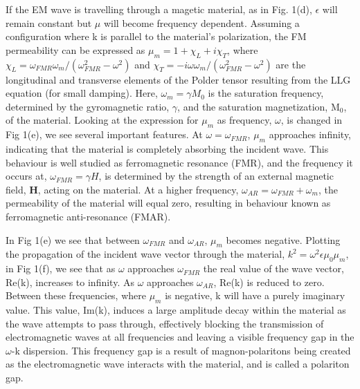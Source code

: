 \documentclass[prb,twocolumn,showpacs,preprintnumbers,amsmath,amssymb]{revtex4-1}
\begin{document}
If the EM wave is travelling through a magetic material, as in Fig. 1(d), $\epsilon$ will remain constant but $\mu$ will become frequency dependent. Assuming a configuration where k is parallel to the material's polarization, the FM permeability can be expressed as $\mu_{m}=1+\chi_{L}+i\chi_{T}$, where $\chi_{L}=\omega_{FMR}\omega_{m}/(\omega_{FMR}^{2}-\omega^{2})$ and $\chi_{T}=-i\omega\omega_{m}/(\omega_{FMR}^{2}-\omega^{2})$ are the longitudinal and transverse elements of the Polder tensor resulting from the LLG equation (for small damping)\cite{MM}. Here, $\omega_{m}=\gamma M_{0}$ is the saturation frequency, determined by the gyromagnetic ratio, $\gamma$, and the saturation magnetization, M$_{0}$, of the material. Looking at the expression for $\mu_{m}$ as frequency, $\omega$, is changed in Fig 1(e), we see several important features. At $\omega=\omega_{FMR}$, $\mu_{m}$ approaches infinity, indicating that the material is completely absorbing the incident wave. This behaviour is well studied as ferromagnetic resonance (FMR), and the frequency it occurs at, $\omega_{FMR}=\gamma H$, is determined by the strength of an external magnetic field, \textbf{H}, acting on the material. At a higher frequency, $\omega_{AR}=\omega_{FMR}+\omega_{m}$, the permeability of the material will equal zero, resulting in behaviour known as ferromagnetic anti-resonance (FMAR).





In Fig 1(e) we see that between $\omega_{FMR}$ and $\omega_{AR}$, $\mu_{m}$ becomes negative. Plotting the propagation of the incident wave vector through the material, $k^{2}=\omega^{2}\epsilon\mu_{0}\mu_{m}$, in Fig 1(f), we see that as $\omega$ approaches $\omega_{FMR}$ the real value of the wave vector, Re(k), increases to infinity. As $\omega$ approaches $\omega_{AR}$, Re(k) is reduced to zero. Between these frequencies, where $\mu_{m}$ is negative, k will have a purely imaginary value. This value, Im(k), induces a large amplitude decay within the material as the wave attempts to pass through, effectively blocking the transmission of electromagnetic waves at all frequencies and leaving a visible frequency gap in the $\omega$-k dispersion. This frequency gap is a result of magnon-polaritons being created as the electromagnetic wave interacts with the material, and is called a polariton gap.
\end{document}

